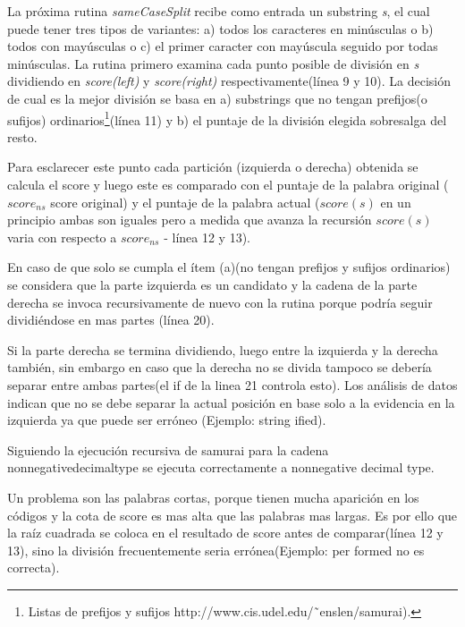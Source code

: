 \documentclass[12pt]{report}
\begin{document}
La próxima rutina \textit{sameCaseSplit} recibe como entrada un substring \textit{s}, el cual puede tener tres tipos de variantes: a) todos los caracteres en minúsculas o b) todos con mayúsculas o c) el primer caracter con mayúscula seguido por todas minúsculas. La rutina primero examina cada punto posible de división en \textit{s} dividiendo en \textit{score(left)} y \textit{score(right)} respectivamente(línea 9 y 10). La decisión de cual es la mejor división se basa en a) substrings que no tengan prefijos(o sufijos) ordinarios\footnote[1]{Listas de prefijos y sufijos http://www.cis.udel.edu/˜enslen/samurai).}(línea 11) y b) el puntaje de la división elegida sobresalga del resto\cite{EHPV09}. 

Para esclarecer este punto cada partición (izquierda o derecha) obtenida se calcula el score y luego este es comparado con el puntaje de la palabra original ($score_{ns}$ score original) y el puntaje de la palabra actual ($score(s)$ en un principio ambas son iguales pero a medida que avanza la recursión $score(s)$ varia con respecto a $score_{ns}$ - línea 12 y 13).

En caso de que solo se cumpla el ítem (a)(no tengan prefijos y sufijos ordinarios) se considera que la parte izquierda es un candidato y la cadena de la parte derecha se invoca recursivamente de nuevo con la rutina porque podría seguir dividiéndose en mas partes (línea 20).

Si la parte derecha se termina dividiendo, luego entre la izquierda y la derecha también, sin embargo en caso que la derecha no se divida tampoco se debería separar entre ambas partes(el \textsf{if} de la linea 21 controla esto). Los análisis de datos indican que no se debe separar la actual posición en base solo a la evidencia en la izquierda ya que puede ser erróneo (Ejemplo: \textsf{string ified}). 

Siguiendo la ejecución recursiva de samurai para la cadena \textsf{nonnegativedecimaltype} se ejecuta correctamente a \textsf{nonnegative decimal type}\cite{EHPV09}.

Un problema son las palabras cortas, porque tienen mucha aparición en los códigos y la cota de score es mas alta que las palabras mas largas. Es por ello que la raíz cuadrada se coloca en el resultado de score antes de comparar(línea 12 y 13), sino la división frecuentemente seria errónea(Ejemplo: \textsf{per formed} no es correcta)\cite{EHPV09}.\\
\end{document}

